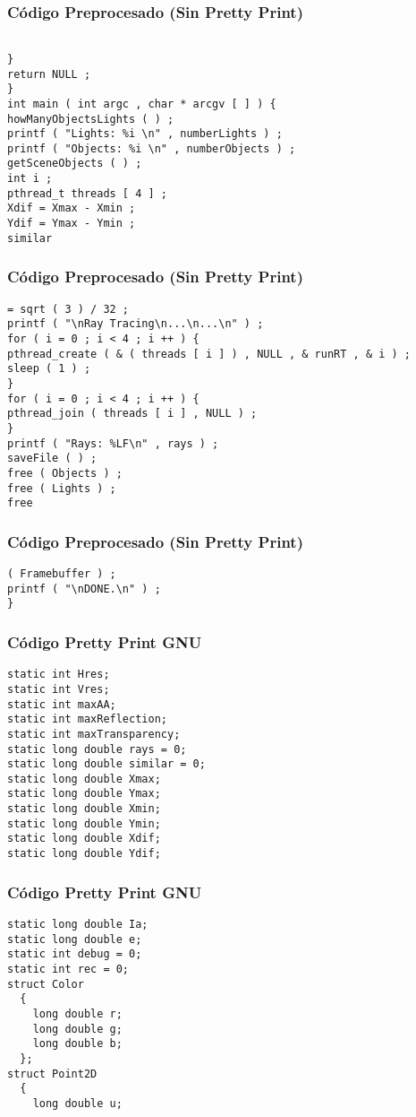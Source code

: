 \documentclass{beamer}
\begin{document}
\begin{frame}[fragile]
\frametitle{C\'odigo Preprocesado (Sin Pretty Print)}
\begin{lstlisting}[style=CStyle]

} 
return NULL ; 
} 
int main ( int argc , char * arcgv [ ] ) { 
howManyObjectsLights ( ) ; 
printf ( "Lights: %i \n" , numberLights ) ; 
printf ( "Objects: %i \n" , numberObjects ) ; 
getSceneObjects ( ) ; 
int i ; 
pthread_t threads [ 4 ] ; 
Xdif = Xmax - Xmin ; 
Ydif = Ymax - Ymin ; 
similar \end{lstlisting}
\end{frame}
\begin{frame}[fragile]
\frametitle{C\'odigo Preprocesado (Sin Pretty Print)}
\begin{lstlisting}[style=CStyle]
= sqrt ( 3 ) / 32 ; 
printf ( "\nRay Tracing\n...\n...\n" ) ; 
for ( i = 0 ; i < 4 ; i ++ ) { 
pthread_create ( & ( threads [ i ] ) , NULL , & runRT , & i ) ; 
sleep ( 1 ) ; 
} 
for ( i = 0 ; i < 4 ; i ++ ) { 
pthread_join ( threads [ i ] , NULL ) ; 
} 
printf ( "Rays: %LF\n" , rays ) ; 
saveFile ( ) ; 
free ( Objects ) ; 
free ( Lights ) ; 
free \end{lstlisting}
\end{frame}
\begin{frame}[fragile]
\frametitle{C\'odigo Preprocesado (Sin Pretty Print)}
\begin{lstlisting}[style=CStyle]
( Framebuffer ) ; 
printf ( "\nDONE.\n" ) ; 
} \end{lstlisting}
\end{frame}
\begin{frame}[fragile]
\frametitle{C\'odigo Pretty Print GNU}
\begin{lstlisting}[style=CStyle]
static int Hres;
static int Vres;
static int maxAA;
static int maxReflection;
static int maxTransparency;
static long double rays = 0;
static long double similar = 0;
static long double Xmax;
static long double Ymax;
static long double Xmin;
static long double Ymin;
static long double Xdif;
static long double Ydif;
\end{lstlisting}
\end{frame}
\begin{frame}[fragile]
\frametitle{C\'odigo Pretty Print GNU}
\begin{lstlisting}[style=CStyle]
static long double Ia;
static long double e;
static int debug = 0;
static int rec = 0;
struct Color
  {
    long double r;
    long double g;
    long double b;
  };
struct Point2D
  {
    long double u;
\end{lstlisting}
\end{frame}
\end{document}
